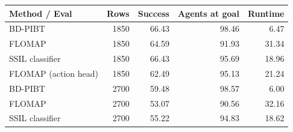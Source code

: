 \scriptsize
\setlength{\tabcolsep}{4pt}
\begin{tabular}{lrrrr}
\toprule
Method / Eval & Rows & Success & Agents at goal & Runtime \\
\midrule
BD-PIBT & 1850 & 66.43 & 98.46 & 6.47 \\
FLOMAP & 1850 & 64.59 & 91.93 & 31.34 \\
SSIL classifier & 1850 & 66.43 & 95.69 & 18.96 \\
FLOMAP (action head) & 1850 & 62.49 & 95.13 & 21.24 \\
BD-PIBT & 2700 & 59.48 & 98.57 & 6.00 \\
FLOMAP & 2700 & 53.07 & 90.56 & 32.16 \\
SSIL classifier & 2700 & 55.22 & 94.83 & 18.62 \\
\bottomrule
\end{tabular}
